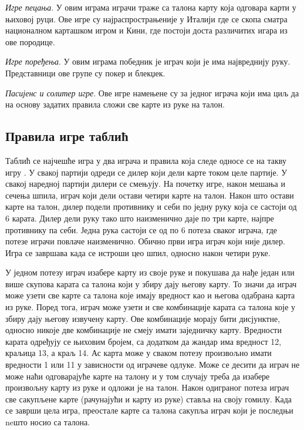 \documentclass[a4paper, 12pt, ngerman]{article}
\let\oldsubsection\subsection
\renewcommand\subsection{\clearpage\oldsubsection}
\begin{document}
\textit{Игре пецања}. У овим играма играчи траже са талона карту која одговара карти у њиховој руци. Ове игре су најраспрострањеније у Италији где се скопа сматра националном карташком игром и Кини, где постоји доста различитих игара из ове породице.

\textit{Игре поређења}. У овим играма победник је играч који је има највреднију руку. Представници ове групе су покер и блекџек.

\textit{Пасијенс и солитер игре}. Ове игре намењене су за једног играча који има циљ да на основу задатих правила сложи све карте из руке на талон.


\subsection{Правила игре таблић}
Таблић се најчешће игра у два играча и правила која следе односе се на такву игру \cite{tablicpravila}. У свакој партији одреди се дилер који дели карте током целе партије. У свакој наредној партији дилери се смењују. На почетку игре, након мешања и сечења шпила, играч који дели остави четири карте на талон. Након што остави карте на талон, дилер подели противнику и себи по једну руку која се састоји од 6 карата. Дилер дели руку тако што наизменично даје по три карте, најпре противнику па себи. Једна рука састоји се од по 6 потеза сваког играча, где потезе играчи повлаче наизменично. Обично први игра играч који није дилер. Игра се завршава када се истроши цео шпил, односно након четири руке.

У једном потезу играч изабере карту из своје руке и покушава да нађе један или више скупова карата са талона који у збиру дају његову карту. То значи да играч може узети све карте са талона које имају вредност као и његова одабрана карта из руке. Поред тога, играч може узети и све комбинације карата са талона које у збиру дају његову извучену карту. Ове комбинације морају бити дисјунктне, односно никоје две комбинације не смеју имати заједничку карту. Вредности карата одређују се њиховим бројем, са додатком да жандар има вредност 12, краљица 13, а краљ 14. Ас карта може у сваком потезу произвољно имати вредности 1 или 11 у зависности од играчеве одлуке. Може се десити да играч не може наћи одговарајуће карте на талону и у том случају треба да изабере произвољну карту из руке и одложи је на талон. Након одиграног потеза играч све сакупљене карте (рачунајући и карту из руке) ставља на своју гомилу. Када се заврши цела игра, преостале карте са талона сакупља играч који је последњи neшто носио са талона.
\end{document}
